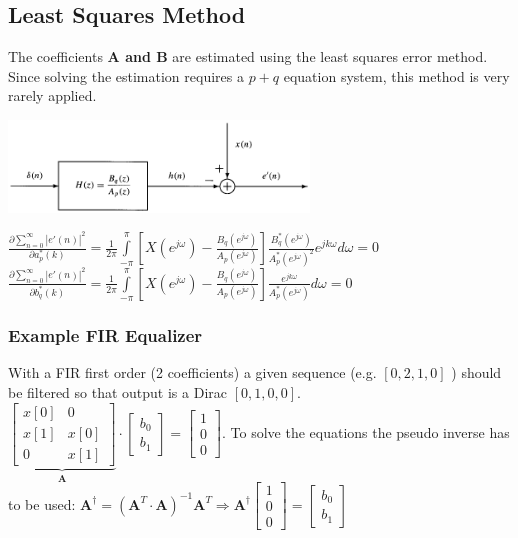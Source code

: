 \subsection{Least Squares Method }
The coefficients \textbf{A and B} are estimated using the least squares error method.
Since solving the estimation requires a $p+q$ equation system, this method is very rarely applied.\\
\begin{minipage}{8cm}
	\includegraphics[width=8cm]{../TSM_StatDig/bilder/signalModeling.png}
\end{minipage}
\begin{minipage}{10cm}
$\frac{\partial \sum\limits_{n=0}^{\infty}|e'(n)|^2}{\partial a_p^*(k)}=\frac{1}{2\pi} \int\limits_{-\pi}^{\pi}\left[X(e^{j\omega})-
\frac{B_q(e^{j\omega})}{A_p (e^{j\omega})}\right]\frac{B^*_q(e^{j\omega})}{A_p^* (e^{j\omega})^2}e^{jk\omega} d\omega=0$\\
$\frac{\partial \sum\limits_{n=0}^{\infty}|e'(n)|^2}{\partial b_q^*(k)}=\frac{1}{2\pi} \int\limits_{-\pi}^{\pi}\left[X(e^{j\omega})-
\frac{B_q(e^{j\omega})}{A_p (e^{j\omega})}\right]\frac{e^{jk\omega}}{A_p^* (e^{j\omega})} d\omega=0$\\
\end{minipage}
\subsubsection{Example FIR Equalizer}
With a FIR first order (2 coefficients) a given sequence (e.g. $[0, 2, 1, 0]$ ) should be filtered so that output is a Dirac $[0, 1 , 0 , 0]$.\\
$\underbrace{\begin{bmatrix}
x[0] 	& 0 	\\
x[1]	& x[0]	\\
0		& x[1]
\end{bmatrix}}_{\bm A}
\cdot \begin{bmatrix}
b_0\\
b_1
\end{bmatrix}=\begin{bmatrix}
1\\
0\\
0
\end{bmatrix}$. To solve the equations the pseudo inverse has to be used: $\bm A^{\dagger} = \left(\bm A^T \cdot \bm A\right)^{-1}\bm A^T
\Rightarrow \bm  A^\dagger \begin{bmatrix}
1\\
0\\
0
\end{bmatrix}=\begin{bmatrix}
b_0\\
b_1
\end{bmatrix}$

